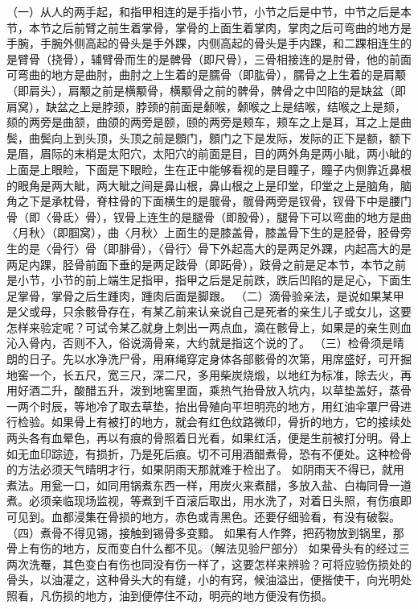\documentclass[12pt,UTF8]{ctexbook}
\begin{document}
（一）从人的两手起，和指甲相连的是手指小节，小节之后是中节，中节之后是本节，本节之后前臂之前生着掌骨，掌骨的上面生着掌肉，掌肉之后可弯曲的地方是手腕，手腕外侧高起的骨头是手外踝，内侧高起的骨头是手内踝，和二踝相连生的是臂骨（挠骨），辅臂骨而生的是髀骨（即尺骨），三骨相接连的是肘骨，他的前面可弯曲的地方是曲肘，曲肘之上生着的是臑骨（即肱骨），臑骨之上生着的是肩颙（即肩头），肩颙之前是横颙骨，横颙骨之前的髀骨，髀骨之中凹陷的是缺盆（即肩窝），缺盆之上是脖颈，脖颈的前面是颡喉，颡喉之上是结喉，结喉之上是颏，颏的两旁是曲颔，曲颌的两旁是颐，颐的两旁是颊车，颊车之上是耳，耳之上是曲鬓，曲鬓向上到头顶，头顶之前是顖门，顖门之下是发际，发际的正下是额，额下是眉，眉际的末梢是太阳穴，太阳穴的前面是目，目的两外角是两小眦，两小眦的上面是上眼睑，下面是下眼睑，生在正中能够看视的是目瞳子，瞳子内侧靠近鼻根的眼角是两大眦，两大眦之间是鼻山根，鼻山根之上是印堂，印堂之上是脑角，脑角之下是承枕骨，脊柱骨的下面横生的是髋骨，髋骨两旁是钗骨，钗骨下中是腰门骨（即〈骨氐〉骨），钗骨上连生的是腿骨（即股骨），腿骨下可以弯曲的地方是曲〈月秋〉（即腘窝），曲〈月秋〉上面生的是膝盖骨，膝盖骨下生的是胫骨，胫骨旁生的是〈骨行〉骨（即腓骨），〈骨行〉骨下外起高大的是两足外踝，内起高大的是两足内踝，胫骨前面下垂的是两足跂骨（即跖骨），跂骨之前是足本节，本节之前是小节，小节的前上端生足指甲，指甲之后是足前跌，跌后凹陷的是足心，下面生足掌骨，掌骨之后生踵肉，踵肉后面是脚跟。
（二）滴骨验亲法，是说如果某甲是父或母，只余骸骨存在，有某乙前来认亲说自己是死者的亲生儿子或女儿，这要怎样来验定呢？可试令某乙就身上刺出一两点血，滴在骸骨上，如果是的亲生则血沁入骨内，否则不入，俗说滴骨亲，大约就是指这个说的了。
（三）检骨须是晴朗的日子。先以水净洗尸骨，用麻绳穿定身体各部骸骨的次第，用席盛好，可开掘地窖一个，长五尺，宽三尺，深二尺，多用柴炭烧煅，以地红为标准，除去火，再用好酒二升，酸醋五升，泼到地窖里面，乘热气抬骨放入坑内，以草垫盖好，蒸骨一两个时辰，等地冷了取去草垫，抬出骨殖向平坦明亮的地方，用红油伞罩尸骨进行检验。如果骨上有被打的地方，就会有红色纹路微印，骨折的地方，它的接续处两头各有血晕色，再以有痕的骨照着日光看，如果红活，便是生前被打分明。骨上如无血印踪迹，有损折，乃是死后痕。切不可用酒醋煮骨，恐有不便处。这种检骨的方法必须天气晴明才行，如果阴雨天那就难于检出了。
如阴雨天不得已，就用煮法。用瓮一口，如同用锅煮东西一样，用炭火来煮醋，多放入盐、白梅同骨一道煮。必须亲临现场监视，等煮到千百滚后取出，用水洗了，对着日头照，有伤痕即可见到。血都浸集在骨损的地方，赤色或青黑色。还要仔细验看，有没有破裂。
（四）煮骨不得见锡，接触到锡骨多变黯。
如果有人作弊，把药物放到锅里，那骨上有伤的地方，反而变白什么都不见。（解法见验尸部分）
如果骨头有的经过三两次洗罨，其色变白有伤也同没有伤一样了，这要怎样来辨验？可将应验伤损处的骨头，以油灌之，这种骨头大的有缝，小的有窍，候油溢出，便揩使干，向光明处照看，凡伤损的地方，油到便停住不动，明亮的地方便没有伤损。
\end{document}
